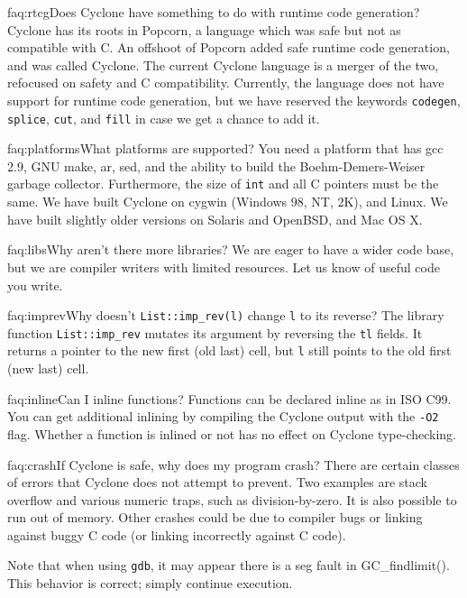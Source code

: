 \begin{faqa}{faq:rtcg}{Does Cyclone have something to do with runtime code generation?}
Cyclone has its roots in Popcorn, a language which was safe but not as
compatible with C\@.  An offshoot of Popcorn added safe runtime code
generation, and was called Cyclone.  The current Cyclone language is a
merger of the two, refocused on safety and C compatibility.
Currently, the language does not have support for runtime code
generation, but we have reserved the keywords \texttt{codegen},
\texttt{splice}, \texttt{cut}, and \texttt{fill} in case we get a
chance to add it.
\end{faqa}

\begin{faqa}{faq:platforms}{What platforms are supported?}
You need a platform that has gcc 2.9, GNU make, ar, sed, and the
ability to build the Boehm-Demers-Weiser garbage collector.
Furthermore, the size of \texttt{int} and all C pointers must be the
same.  We have built Cyclone on cygwin (Windows 98, NT, 2K), and Linux.
We have built slightly older versions on Solaris and OpenBSD, and
Mac OS X.
\end{faqa}

\begin{faqa}{faq:libs}{Why aren't there more libraries?}
We are eager to have a wider code base, but we are compiler writers
with limited resources.  Let us know of useful code you write.
\end{faqa}

\begin{faqa}{faq:imprev}{Why doesn't \texttt{List::imp_rev(l)} change \texttt{l} to its reverse?} 
The library function \texttt{List::imp_rev} mutates its argument by
reversing the \texttt{tl} fields.  It returns a pointer to the new
first (old last) cell, but \texttt{l} still points to the old first
(new last) cell.
\end{faqa}

\begin{faqa}{faq:inline}{Can I inline functions?}
Functions can be declared inline as in ISO C99.  You can get additional
inlining by compiling the Cyclone output with the \texttt{-O2} flag.
Whether a function is inlined or not has no effect on Cyclone
type-checking.
\end{faqa}

\begin{faqa}{faq:crash}{If Cyclone is safe, why does my program crash?}
There are certain classes of errors that Cyclone does not attempt to
prevent.  Two examples are stack overflow and various numeric traps,
such as division-by-zero.  It is also possible to run out of memory.
Other crashes could be due to compiler bugs or linking against buggy C
code (or linking incorrectly against C code).

Note that when using \texttt{gdb}, it may appear there is a seg fault
in GC_findlimit().  This behavior is correct; simply continue
execution.
\end{faqa}

